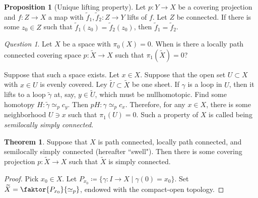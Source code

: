 \documentclass[10pt,letterpaper,cm]{nupset}
\theoremstyle{definition}
\theoremstyle{theorem}
\newtheorem{theorem}[definition]{Theorem}
\newtheorem{prop}[definition]{Proposition}
\theoremstyle{remark}
\newtheorem*{question}{Question}
\newcommand{\1}{\mathbb{1}}
\newcommand{\0}{\vec 0}
\begin{document}
\begin{prop}[Unique lifting property]\label{ULP}
Let $p: Y \to X$ be a covering projection and $f: Z \to X$ a map with $\tilde{f}_1, \tilde{f}_2 : Z \to Y$ lifts of $f$. Let $Z$ be connected. If there is some $z_0 \in Z$ such that $\tilde{f}_1(z_0) = \tilde{f}_2(z_0)$, then $\tilde{f}_1 =  \tilde{f}_2$.
\end{prop}

\begin{question}
Let $X$ be a space with  $\pi_0(X) =0$. When is there a locally path connected covering space $p: \widetilde{X} \to X$ such that $\pi_1\left(\widetilde{X}\right) =0$? 
\end{question}

Suppose that such a space exists. Let $x \in X$. Suppose that the open set $U \subset X$ with $x\in U$ is evenly covered. Ley $\widetilde{U} \subset \widetilde{X}$ be one sheet.  If $\gamma$ is a loop in $U$, then it lifts to a loop $\tilde{\gamma}$ at, say, $y \in \widetilde{U}$, which must be nullhomotopic. Find some homotopy $H: \tilde{\gamma} \simeq_p c_y$. Then $pH : \gamma \simeq_p c_x$. Therefore, for any $x\in X$, there is some neighborhood $U\ni x$ such that $\pi_1(U) =0$.
Such a property of $X$ is called being \textit{semilocally simply connected}. 


\begin{theorem}
Suppose that $X$ is path connected, locally path connected, and semilocally simply connected (hereafter ``swell"). Then there is some covering projection $p: \widetilde{X} \to X$ such that $\widetilde{X}$ is simply connected. 
\end{theorem}
\begin{proof}
Pick $x_0 \in X$. Let $P_{x_0} \coloneqq  \{\gamma : I \to X \mid \gamma(0) = x_0\}$. Set $\widetilde{X} = \faktor{P_{x_0}}{\simeq_p}$, endowed with the compact-open topology. 
\end{proof}
\end{document}
